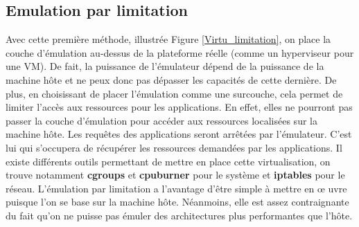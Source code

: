 \subsection{Emulation par limitation}
\label{section:limitation}

Avec cette première méthode, illustrée Figure \ref{Virtu_limitation}, on place
la couche d'émulation au-dessus de la plateforme réelle (comme un hyperviseur
pour une VM). De fait, la puissance de l'émulateur dépend de la puissance de la
machine hôte et ne peux donc pas dépasser les capacités de cette dernière. De
plus, en choisissant de placer l'émulation comme une surcouche, cela permet de
limiter l'accès aux ressources pour les applications. En effet, elles ne
pourront pas passer la couche d'émulation pour accéder aux ressources localisées
sur la machine hôte. Les requêtes des applications seront arrêtées par
l'émulateur. C'est lui qui s'occupera de récupérer les ressources demandées par
les applications. Il existe différents outils permettant de mettre en place
cette virtualisation, on trouve notamment \textbf{cgroups} \citep{cgroups} et
\textbf{cpuburner} \citep{canon2006wrekavoc, buchert2011methods} pour le système
et \textbf{iptables} \citep{netfilter_iptables, iptables_man} pour le
réseau. L'émulation par limitation a l'avantage d'être simple à mettre en \oe
uvre puisque l'on se base sur la machine hôte. Néanmoins, elle est assez
contraignante du fait qu'on ne puisse pas émuler des architectures plus
performantes que l'hôte.

